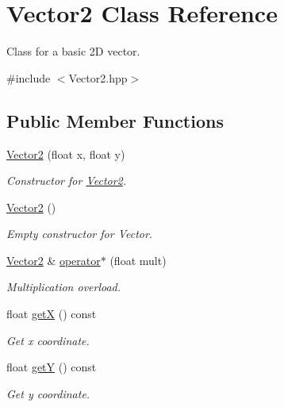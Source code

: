 \hypertarget{classVector2}{}\section{Vector2 Class Reference}
\label{classVector2}


Class for a basic 2D vector.  




{\ttfamily \#include $<$Vector2.\+hpp$>$}

\subsection*{Public Member Functions}
\begin{DoxyCompactItemize}
\item 
\mbox{\hyperlink{classVector2_a061ab58a0e216c759d64e3746d712b12}{Vector2}} (float x, float y)
\begin{DoxyCompactList}\small\item\em Constructor for \mbox{\hyperlink{classVector2}{Vector2}}. \end{DoxyCompactList}\item 
\mbox{\label{classVector2_a22104d1809be26a419ef1f959e3761bf}} 
\mbox{\hyperlink{classVector2_a22104d1809be26a419ef1f959e3761bf}{Vector2}} ()
\begin{DoxyCompactList}\small\item\em Empty constructor for Vector. \end{DoxyCompactList}\item 
\mbox{\hyperlink{classVector2}{Vector2}} \& \mbox{\hyperlink{classVector2_a2b00999bdfe377965239a8f44d7c192c}{operator$\ast$}} (float mult)
\begin{DoxyCompactList}\small\item\em Multiplication overload. \end{DoxyCompactList}\item 
float \mbox{\hyperlink{classVector2_a808d02062efcc0c016491c04845e3e34}{getX}} () const
\begin{DoxyCompactList}\small\item\em Get x coordinate. \end{DoxyCompactList}\item 
float \mbox{\hyperlink{classVector2_a59bf838c0fc50305975e1679509fda83}{getY}} () const
\begin{DoxyCompactList}\small\item\em Get y coordinate. \end{DoxyCompactList}\end{DoxyCompactItemize}
